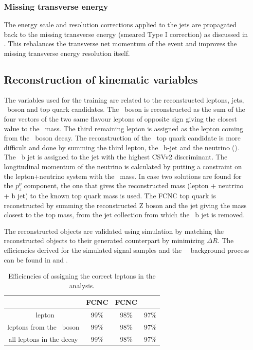 \subsubsection*{Missing transverse energy}
The energy scale and resolution corrections applied to the jets are propagated back to the  missing transverse energy (smeared Type I correction) as discussed in . This rebalances the transverse net momentum of the event and improves the missing transverse energy resolution itself.

\subsection{Reconstruction of kinematic variables}
The variables used for  the training are related to the reconstructed leptons, jets, \PZ\ boson and top quark candidates. The \PZ\ boson is reconstructed as the sum of the four vectors of the two same flavour leptons of opposite sign giving the closest value to the \PZ\ mass. The third remaining lepton is assigned as the lepton coming from the \PW\ boson decay.
The reconstruction of the \SM\ top quark candidate is more difficult and done by summing the third lepton, the \SM\ b-jet and the neutrino (\Etmiss). The \SM\ b jet is assigned to the jet with the highest CSVv2 discriminant. The longitudinal momentum of the neutrino is calculated by putting a constraint on the lepton+neutrino system with the \PW\ mass. In case two solutions are found for the $p_z^{\nu}$ component, the one that gives the reconstructed mass (lepton + neutrino + b jet) to  the known top quark mass is used. 
The FCNC top quark is reconstructed by summing the reconstructed Z boson and the jet giving the mass closest to the top mass, from the jet collection from which the \SM\ b jet is removed. 

The reconstructed objects are validated using simulation by matching the reconstructed objects to their generated counterpart by minimizing $\Delta R$. The efficiencies derived for the simulated signal samples and the \SM\ \tZq\ background process can be found in  and . 

\begin{table}[htbp]
	\centering
	\caption{Efficiencies of assigning the correct leptons in the analysis.}
	\begin{tabular}{cccc}
		\toprule 
		& FCNC \tZq  & FCNC \tZ & \SM\ \tZq \\ 
		\midrule
		\PW\ lepton & 99\% & 98\% & 97\% \\ 
	
		leptons from the \PZ\ boson  & 99\% & 98\% & 97\% \\ 
		 
		all leptons in the decay & 99\% & 98\% & 97\% \\ 
		\bottomrule
	\end{tabular} 
	\label{tab:matching}
\end{table}


